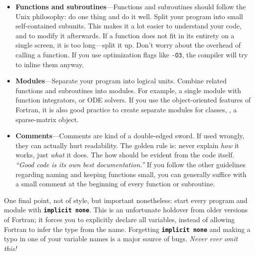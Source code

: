 \documentclass[openany,oneside]{report}
\newcommand{\keyword}[1]{\texttt{\bfseries\color{DarkRed}#1}}
\begin{document}
\begin{itemize}
  \item\textbf{Functions and subroutines}---Functions and subroutines should follow the Unix philosophy: do one thing and do it well.
    Split your program into small self-contained subunits.
    This makes it a lot easier to understand your code, and to modify it afterwards.
    If a function does not fit in its entirety on a single screen, it is too long---split it up.
    Don't worry about the overhead of calling a function.
    If you use optimization flags like \texttt{-O3}, the compiler will try to inline them anyway.
  \item\textbf{Modules}---Separate your program into logical units.
    Combine related functions and subroutines into modules.
    For example, a single module with function integrators, or ODE solvers.
    If you use the object-oriented features of Fortran, it is also good practice to create separate modules for classes, \eg, a sparse-matrix object.
  \item\textbf{Comments}---Comments are kind of a double-edged sword.
    If used wrongly, they can actually hurt readability.
    The golden rule is: never explain \emph{how} it works, just \emph{what} it does.
    The how should be evident from the code itself.
    \emph{``Good code is its own best documentation.''} If you follow the other guidelines regarding naming and keeping functions small, you can generally suffice with a small comment at the beginning of every function or subroutine.
\end{itemize}
One final point, not of style, but important nonetheless: start every program and module with \keyword{implicit none}.
This is an unfortunate holdover from older versions of Fortran; it forces you to explicitly declare all variables, instead of allowing Fortran to infer the type from the name.
Forgetting \keyword{implicit none} and making a typo in one of your variable names is a major source of bugs.
\emph{Never ever omit this!}

\appendix
\end{document}
